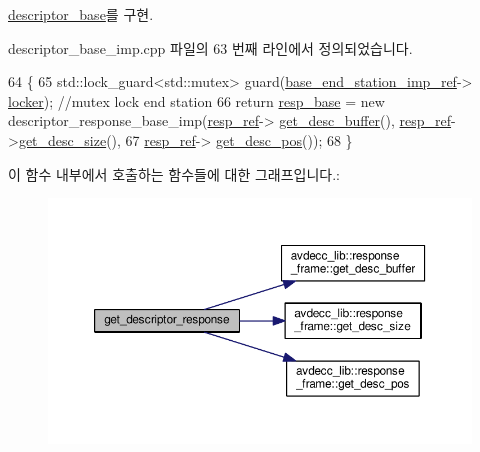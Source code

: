 \hyperlink{classavdecc__lib_1_1descriptor__base_ac64e6a5ee8781eeb9c781953e845b1be}{descriptor\+\_\+base}를 구현.



descriptor\+\_\+base\+\_\+imp.\+cpp 파일의 63 번째 라인에서 정의되었습니다.


\begin{DoxyCode}
64 \{
65     std::lock\_guard<std::mutex> guard(\hyperlink{classavdecc__lib_1_1descriptor__base__imp_a550c969411f5f3b69f55cc139763d224}{base\_end\_station\_imp\_ref}->
      \hyperlink{classavdecc__lib_1_1end__station__imp_a2207f93fef130266b292686bf96ef8d3}{locker}); \textcolor{comment}{//mutex lock end station}
66     \textcolor{keywordflow}{return} \hyperlink{classavdecc__lib_1_1descriptor__base__imp_a8b104da8319cda946944548ebb9552f4}{resp\_base} = \textcolor{keyword}{new} descriptor\_response\_base\_imp(\hyperlink{classavdecc__lib_1_1descriptor__base__imp_a2642e3a7c10d38553e7ff4a55e875346}{resp\_ref}->
      \hyperlink{classavdecc__lib_1_1response__frame_a87db6e7ad7e047437cf9c9eaab873626}{get\_desc\_buffer}(), \hyperlink{classavdecc__lib_1_1descriptor__base__imp_a2642e3a7c10d38553e7ff4a55e875346}{resp\_ref}->\hyperlink{classavdecc__lib_1_1response__frame_a5302ae13c549f066040ce0e7c7d11ae6}{get\_desc\_size}(),
67                                                         \hyperlink{classavdecc__lib_1_1descriptor__base__imp_a2642e3a7c10d38553e7ff4a55e875346}{resp\_ref}->
      \hyperlink{classavdecc__lib_1_1response__frame_a6e6f6cc3d681d41c6de6139ca9cb79d9}{get\_desc\_pos}());
68 \}
\end{DoxyCode}


이 함수 내부에서 호출하는 함수들에 대한 그래프입니다.\+:
\nopagebreak
\begin{figure}[H]
\begin{center}
\leavevmode
\includegraphics[width=350pt]{classavdecc__lib_1_1descriptor__base__imp_a8c64c9df60afbc144cf24eab5a42c009_cgraph}
\end{center}
\end{figure}




